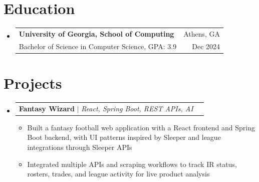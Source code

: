 \documentclass[letterpaper,11pt]{article}
\makeatletter
\newcommand{\resumeItem}[1]{
  \item\small{
    {#1 \vspace{-1pt}}
  }
}
\newcommand{\resumeSubheading}[4]{
  \vspace{-2pt}\item
    \begin{tabular*}{0.97\textwidth}[t]{l@{\extracolsep{\fill}}r}
      \textbf{#1} & #2 \\
      {\small#3} & {\small #4} \\
    \end{tabular*}\vspace{-7pt}
}
\newcommand{\resumeProjectHeading}[2]{
    \item
    \begin{tabular*}{0.97\textwidth}{l@{\extracolsep{\fill}}r}
      \small#1 & #2 \\
    \end{tabular*}\vspace{-7pt}
}
\newcommand{\resumeSubHeadingListStart}{\begin{itemize}[leftmargin=0.15in, label={}]}
\newcommand{\resumeSubHeadingListEnd}{\end{itemize}}
\newcommand{\resumeItemListStart}{\begin{itemize}[leftmargin=0.18in,itemsep=1pt,topsep=2pt]}
\newcommand{\resumeItemListEnd}{\end{itemize}\vspace{-5pt}}
\makeatother
\begin{document}
\section{Education}
  \resumeSubHeadingListStart
    \resumeSubheading
      {University of Georgia, School of Computing}{Athens, GA}
      {Bachelor of Science in Computer Science, GPA: 3.9}{Dec 2024}
  \resumeSubHeadingListEnd

%
\section{Projects}
    \resumeSubHeadingListStart
      \resumeProjectHeading
          {\textbf{Fantasy Wizard} $|$ \emph{React, Spring Boot, REST APIs, AI}}{}
          \resumeItemListStart
            \resumeItem{Built a fantasy football web application with a React frontend and Spring Boot backend, with UI patterns inspired by Sleeper and league integrations through Sleeper APIs}
            \resumeItem{Integrated multiple APIs and scraping workflows to track IR status, rosters, trades, and league activity for live product analysis}
          \resumeItemListEnd
    \resumeSubHeadingListEnd

\end{document}
